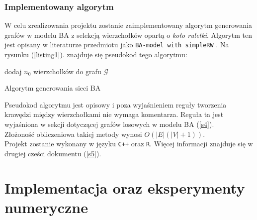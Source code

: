 \documentclass{article}
\def\lecturemark{}
\newcommand{\spr}[1]{\part{#1}\def\lecturemark{\partname\ \thepart: #1}}
\renewcommand{\partname}{Sprawozdanie}
\renewcommand{\thepart}{\arabic{part}}
\begin{document}
\section{Implementowany algorytm \label{s2}}
	W celu zrealizowania projektu zostanie zaimplementowany algorytm generowania grafów w modelu BA z selekcją wierzchołków 
	opartą o \textit{koło ruletki}. Algorytm ten jest opisany w literaturze przedmiotu jako \texttt{BA-model with simpleRW} \cite{simpleRW}.
	Na rysunku (\ref{listing1}). znajduje się pseudokod tego algorytmu:\\
	\begin{algorithm}[H]
		dodaj $n_0$ wierzchołków do grafu $\mathcal{G}$ \\
		\label{listing1}
		\caption{Algorytm generowania sieci BA}
	\end{algorithm}
	Pseudokod algorytmu jest opisowy i poza wyjaśnieniem reguły tworzenia krawędzi między
	wierzchołkami nie wymaga komentarza. Reguła ta jest wyjaśniona w sekcji dotyczącej grafów losowych
	w modelu BA (\ref{s4}).\\
	Złożoność obliczeniowa takiej metody wynosi $O(|E|(|V|+1))$. \\
	Projekt zostanie wykonany w języku \texttt{C++} oraz \texttt{R}. Więcej informacji znajduje się w drugiej cześci dokumentu (\ref{s5}). 
\spr{Implementacja oraz eksperymenty numeryczne \label{part2}}
\end{document}
